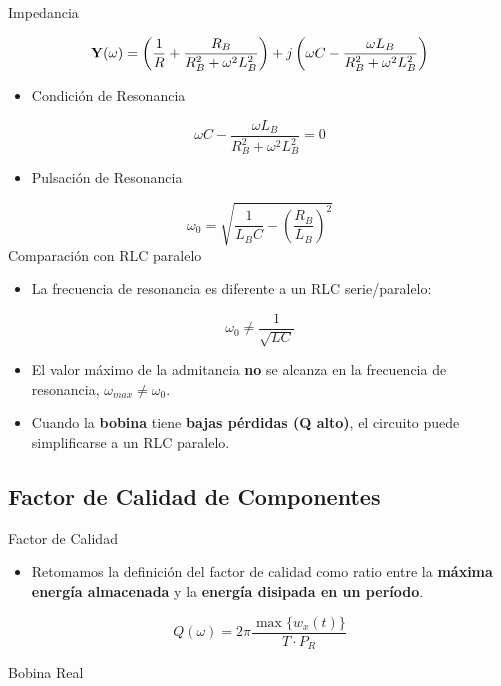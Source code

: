 {Impedancia}


\[
\mathbf{Y}(\omega) = \left(\frac{1}{R} + \frac{R_B}{R_B^2 + \omega^2 L_B^2}\right) + j \left(\omega C - \frac{\omega L_B}{R_B^2 + \omega^2 L_B^2}\right)
\]
\begin{itemize}
\item Condición de Resonancia
\end{itemize}
\[
  \omega C - \frac{\omega L_B}{R_B^2 + \omega^2 L_B^2} = 0 
\]

\begin{itemize}
\item Pulsación de Resonancia
\end{itemize}
\[
\omega_0 = \sqrt{\frac{1}{L_BC} - \left(\frac{R_B}{L_B}\right)^2}
\]
{Comparación con RLC paralelo}

\begin{itemize}
\item La frecuencia de resonancia es diferente a un RLC serie/paralelo:
\end{itemize}

\[
\omega_0 \neq \frac{1}{\sqrt{LC}}
\]

\begin{itemize}
\item El valor máximo de la admitancia \textbf{no} se alcanza en la frecuencia de resonancia, \(\omega_{max} \neq \omega_0\).

\item Cuando la \textbf{bobina} tiene \textbf{bajas pérdidas (Q alto)}, el circuito puede simplificarse a un RLC paralelo.
\end{itemize}
\subsection{Factor de Calidad de Componentes}

{Factor de Calidad}

\begin{itemize}
\item Retomamos la definición del factor de calidad como ratio entre la \textbf{máxima energía almacenada} y la \textbf{energía disipada en un período}.
\end{itemize}

\[
  Q(\omega) = 2\pi \frac{\max\{w_x(t)\}}{T \cdot P_R}
\]

{Bobina Real}

